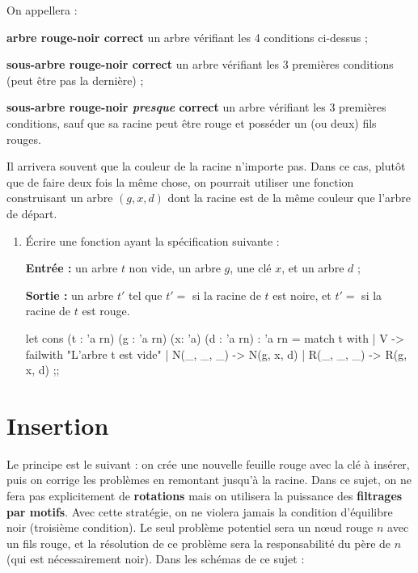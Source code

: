 \documentclass[a4paper,french,bookmarks]{article}
\newcommand{\rouge}{{\color{main9} rouge}}
\newcommand{\rouges}{{\color{main9} rouges}}
\begin{document}
On appellera :

\begin{enumerate}
    \ithand \textbf{arbre \rouge{}-noir correct} un arbre vérifiant les 4 conditions ci-dessus ;
    
    \ithand \textbf{sous-arbre \rouge{}-noir correct} un arbre vérifiant les 3 premières conditions (peut être pas la dernière) ;
    
    \ithand \textbf{sous-arbre \rouge{}-noir \textit{presque} correct} un arbre vérifiant les 3 premières conditions, sauf que sa racine peut être \rouge{} et posséder un (ou deux) fils \rouges{}.
\end{enumerate}

Il arrivera souvent que la couleur de la racine n'importe pas. Dans ce cas, plutôt que de faire deux fois la même chose, on pourrait utiliser une fonction construisant un arbre $\left(g, x, d\right)$ dont la racine est de la même couleur que l'arbre de départ.

\begin{enumerate}
    \item Écrire une fonction  ayant la spécification suivante :
    \begin{enumerate}
        \itt \textbf{Entrée :} un arbre $t$ non vide, un arbre $g$, une clé $x$, et un arbre $d$ ;
        
        \itt \textbf{Sortie :} un arbre $t'$ tel que $t' =$  si la racine de $t$ est noire, et $t' =$  si la racine de $t$ est \rouge{}.
    \end{enumerate}
    
    \begin{ocaml}
let cons (t : 'a rn) (g : 'a rn) (x: 'a) (d : 'a rn) : 'a rn = match t with
    | V -> failwith "L'arbre t est vide"
    | N(_, _, _) -> N(g, x, d)
    | R(_, _, _) -> R(g, x, d)
;;
    \end{ocaml}

\end{enumerate}

\section{Insertion}

Le principe est le suivant : on crée une nouvelle feuille \rouge{} avec la clé à insérer, puis on corrige les problèmes en remontant jusqu'à la racine. Dans ce sujet, on ne fera pas explicitement de \textbf{rotations} mais on utilisera la puissance des \textbf{filtrages par motifs}. Avec cette stratégie, on ne violera jamais la condition d'équilibre noir (troisième condition). Le seul problème potentiel sera un nœud \rouge{} $n$ avec un fils \rouge{}, et la résolution de ce problème sera la
responsabilité du père de $n$ (qui est nécessairement noir). Dans les schémas de ce sujet :
\end{document}
